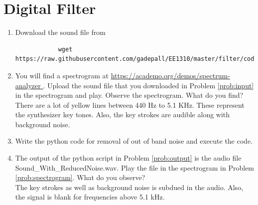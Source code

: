 \documentclass[journal,12pt,twocolumn]{IEEEtran}
\renewcommand\thesection{\arabic{section}}
\begin{document}
	\section{Digital Filter}
	\begin{enumerate}[label=\thesection.\arabic*
		,ref=\thesection.\theenumi]
		\item
		\label{prob:input}
		Download the sound file from  
		\begin{lstlisting}
			wget https://raw.githubusercontent.com/gadepall/EE1310/master/filter/codes/Sound_Noise.wav
		\end{lstlisting}
		\item
		\label{prob:spectrogram}
		You will find a spectrogram at \href{https://academo.org/demos/spectrum-analyzer}{\url{https://academo.org/demos/spectrum-analyzer} }. 
		Upload the sound file that you downloaded in Problem \ref{prob:input} in the spectrogram  and play.  Observe the spectrogram. What do you find?
		\\
		\solution There are a lot of yellow lines between 440 Hz to 5.1 KHz.  These represent the synthesizer key tones. Also, the key strokes
		are audible along with background noise.
		\item
		\label{prob:output}
		Write the python code for removal of out of band noise and execute the code.
		\\
		\solution
		
		\item
		The output of the python script in Problem \ref{prob:output} is the audio file Sound\_With\_ReducedNoise.wav. Play the file in the spectrogram in Problem \ref{prob:spectrogram}. What do you observe?
		\\
		\solution The key strokes as well as background noise is subdued in the audio.  Also,  the signal is blank for frequencies above 5.1 kHz.
		
	\end{enumerate}
\end{document}
